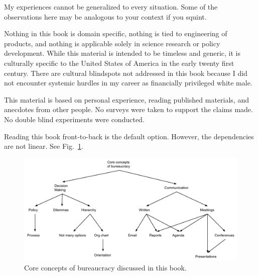 My experiences cannot be generalized to every situation. Some of the observations here may be analogous to your context if you squint. 

Nothing in this book is domain specific, nothing is tied to engineering of products, and nothing is applicable solely in science research or policy development. While this material is intended to be timeless and generic, it is culturally specific to the United States of America in the early twenty first century. There are cultural blindspots not addressed in this book because I did not encounter systemic hurdles in my career as financially privileged white male. 

This material is based on personal experience, reading published materials, and anecdotes from other people. No surveys were taken to support the claims made. No double blind experiments were conducted. 

Reading this book front-to-back is the default option. However, the dependencies are not linear. See Fig.~\ref{fig:core-concepts}.

\begin{figure}[ht]
    \centering
    \includegraphics[width=1\textwidth]{images/core_concepts_map.pdf}
    \caption{Core concepts of bureaucracy discussed in this book. }
    \label{fig:core-concepts}
\end{figure}



